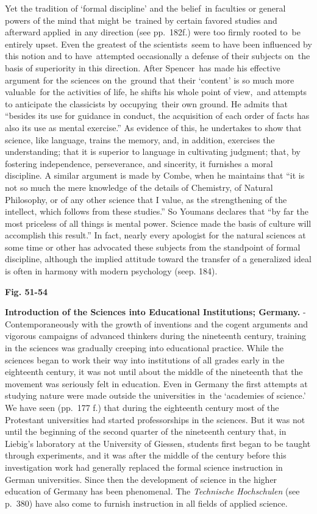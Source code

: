 \documentclass[
]{book}
\begin{document}
Yet the tradition of `formal discipline' and the belief~in faculties or general powers of the mind that might be~trained by certain favored studies and afterward applied~in any direction (see pp.~182f.) were too firmly rooted to~be entirely upset. Even the greatest of the scientists~seem to have been influenced by this notion and to have~attempted occasionally a defense of their subjects on~the basis of superiority in this direction. After Spencer~has made his effective argument for the sciences on the~ground that their `content' is so much more valuable~for the activities of life, he shifts his whole point of view,~and attempts to anticipate the classicists by occupying~their own ground. He admits that ``besides its use for guidance in conduct, the acquisition of each order of facts has also its use as mental exercise.'' As evidence of this, he undertakes to show that science, like language, trains the memory, and, in addition, exercises the understanding; that it is superior to language in cultivating judgment; that, by fostering independence, perseverance, and sincerity, it furnishes a moral discipline. A similar argument is made by Combe, when he maintains that ``it is not so much the mere knowledge of the details of Chemistry, of Natural Philosophy, or of any other science that I value, as the strengthening of the intellect, which follows from these studies.'' So Youmans declares that ``by far the most priceless of all things is mental power. Science made the basis of culture will accomplish this result.'' In fact, nearly every apologist for the natural sciences at some time or other has advocated these subjects from the standpoint of formal discipline, although the implied attitude toward the transfer of a generalized ideal is often in harmony with modern psychology (seep. 184).

\textbf{Fig. 51-54}

\textbf{Introduction of the Sciences into Educational Institutions; Germany.} - Contemporaneously with the growth of inventions and the cogent arguments and vigorous campaigns of advanced thinkers during the nineteenth century, training in the sciences was gradually creeping into educational practice. While the sciences began to work their way into institutions of all grades early in the eighteenth century, it was not until about the middle of the nineteenth that the movement was seriously felt in education. Even in Germany the first attempts at studying nature were made outside the universities in~the `academies of science.' We have seen (pp.~177 f.) that during the eighteenth century most of the Protestant universities had started professorships in the sciences. But it was not until the beginning of the second quarter of the nineteenth century that, in Liebig's laboratory at the University of Giessen, students first began to be taught through experiments, and it was after the middle of the century before this investigation work had generally replaced the formal science instruction in German universities. Since then the development of science in the higher education of Germany has been phenomenal. The \emph{Technische Hochschulen} (see p.~380) have also come to furnish instruction in all fields of applied science.
\end{document}
